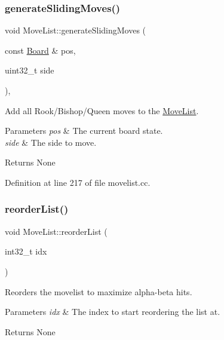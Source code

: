 \subsubsection{\texorpdfstring{generate\+Sliding\+Moves()}{generateSlidingMoves()}}
{\footnotesize\ttfamily void Move\+List\+::generate\+Sliding\+Moves (\begin{DoxyParamCaption}\item[{const \mbox{\hyperlink{classBoard}{Board}} \&}]{pos,  }\item[{uint32\+\_\+t}]{side }\end{DoxyParamCaption})\hspace{0.3cm}{\ttfamily [private]}, {\ttfamily [noexcept]}}



Add all Rook/\+Bishop/\+Queen moves to the \mbox{\hyperlink{classMoveList}{Move\+List}}. 


\begin{DoxyParams}{Parameters}
{\em pos} & The current board state. \\
\hline
{\em side} & The side to move. \\
\hline
\end{DoxyParams}
\begin{DoxyReturn}{Returns}
None 
\end{DoxyReturn}


Definition at line 217 of file movelist.\+cc.

\mbox{\label{classMoveList_a24fbd4061fa4ffb33cdb1ab4a5a2001a}} 
\subsubsection{\texorpdfstring{reorder\+List()}{reorderList()}}
{\footnotesize\ttfamily void Move\+List\+::reorder\+List (\begin{DoxyParamCaption}\item[{int32\+\_\+t}]{idx }\end{DoxyParamCaption})\hspace{0.3cm}{\ttfamily [noexcept]}}



Reorders the movelist to maximize alpha-\/beta hits. 


\begin{DoxyParams}{Parameters}
{\em idx} & The index to start reordering the list at. \\
\hline
\end{DoxyParams}
\begin{DoxyReturn}{Returns}
None 
\end{DoxyReturn}


